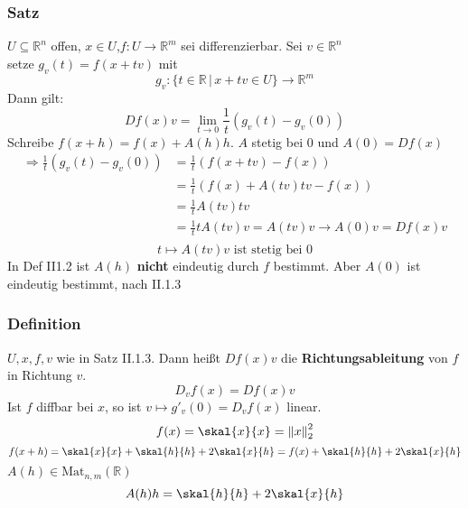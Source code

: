 \subsubsection{Satz} %
\label{ssub:satz}
$U \subseteq \mathbb{R}^n$ offen, $x \in U$,$f: U \to \mathbb{R}^m$ sei differenzierbar. Sei $v \in \mathbb{R}^n$ \\
setze $g_v(t)=f(x+tv)$ mit 
\[
	g_v:\{t \in \mathbb{R} \,|\,x+tv \in U \} \to \mathbb{R}^m
\]
Dann gilt:
\[
	Df(x)v = \lim_{t \to 0} \frac{1}{t}(g_v(t)-g_v(0))
\]
Schreibe $f(x+h)=f(x)+A(h)h$. $A$ stetig bei $0$ und $A(0)=Df(x)$
\begin{align*}
	\Rightarrow \frac{1}{t}(g_v(t)-g_v(0))&= \frac{1}{t}(f(x+tv)-f(x))  \\
	&= \frac{1}{t}(f(x)+A(tv)tv-f(x)) \\
	&= \frac{1}{t}A(tv)tv \\
	&= \frac{1}{t}tA(tv)v = A(tv)v \longrightarrow A(0)v = Df(x)v \\
\end{align*}
\[
	t \mapsto A(tv)v \text{ ist stetig bei $0$}
\] \bewende
{}
In Def II1.2 ist $A(h)$ {\bfseries nicht} eindeutig durch $f$ bestimmt. Aber $A(0)$ ist eindeutig bestimmt, nach II.1.3
\subsubsection{Definition} %
\label{ssub:definition}
$U,x,f,v$ wie in Satz II.1.3. Dann heißt $Df(x)v$ die {\bfseries Richtungsableitung} von $f$ in Richtung $v$.
\[
	D_vf(x)=Df(x)v
\] 
Ist $f$ diffbar bei $x$, so ist $v \mapsto g'_v(0)=D_vf(x)$ linear.
\[
	f(x)=\skal{x}{x}=\norm{x}_2^2
\]
\[
	f(x+h)=\skal{x}{x}+\skal{h}{h}+2\skal{x}{h}=f(x)+\skal{h}{h}+2\skal{x}{h}
\]
$A(h) \in \text{Mat}_{n,m}(\mathbb{R})$
\[
	A(h)h= \skal{h}{h}+2 \skal{x}{h}   
\]
